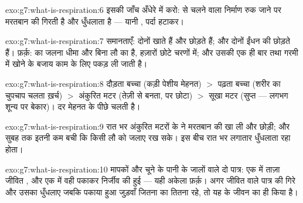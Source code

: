 \begin{solution}{exo:g7:what-is-respiration:6}
इसकी जाँच अँधेरे में करो:  से चलने वाला निर्माण रुक जाने पर
मरतबान की  गिरती है और  धुँधलाता है --- यानी ,
पर्दा हटाकर।
\end{solution}

\begin{solution}{exo:g7:what-is-respiration:7}
समानताएँ: दोनों  खाते हैं और  छोड़ते हैं; और
दोनों ईंधन की  छोड़ते हैं। फ़र्क़:  का जलना धीमा और बिना लौ
का है, हज़ारों छोटे चरणों में; और उसकी  एक ही बार  तथा गरमी
में खोने के बजाय काम के लिए पकड़ ली जाती है।
\end{solution}

\begin{solution}{exo:g7:what-is-respiration:8}
दौड़ता बच्चा (कड़ी पेशीय मेहनत) $>$ पढ़ता बच्चा (शरीर का चुपचाप चलता
ख़र्च) $>$ अंकुरित मटर (तेज़ी से बनता, पर छोटा) $>$ सूखा मटर (सुप्त ---
 लगभग शून्य पर बेकार)। दर मेहनत के पीछे चलती है।
\end{solution}

\begin{solution}{exo:g7:what-is-respiration:9}
रात भर अंकुरित मटरों के  ने मरतबान की  खा ली और  छोड़ी; और सुबह तक इतनी कम  बची कि किसी लौ को जलाए रख
सके। इस बीच  रात भर लगातार धुँधलाता रहा होता।
\end{solution}

\begin{solution}{exo:g7:what-is-respiration:10}
मापकों और चूने के पानी के जालों वाले दो पात्र: एक में ताज़ा जीवित
, और एक में वही  पकाकर निर्जीव की हुई --- यही अकेला फ़र्क़।
अगर जीवित वाले पात्र की  गिरे और उसका  धुँधलाए जबकि
पकाया हुआ जुड़वाँ जितना का तितना रहे, तो यह  के जीवन का ही किया
है।
\end{solution}

